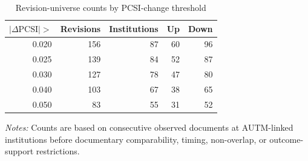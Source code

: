 \begin{table}[htbp]\centering
\caption{Revision-universe counts by PCSI-change threshold}\label{tab:thresholduniverse}
\begin{threeparttable}\small
\begin{tabular}{rrrrr}\toprule
$|\Delta\mathrm{PCSI}|>$ & Revisions & Institutions & Up & Down \\\midrule
0.020 & 156 & 87 & 60 & 96 \\
0.025 & 139 & 84 & 52 & 87 \\
0.030 & 127 & 78 & 47 & 80 \\
0.040 & 103 & 67 & 38 & 65 \\
0.050 & 83 & 55 & 31 & 52 \\
\bottomrule
\end{tabular}
\begin{tablenotes}[flushleft]\footnotesize
\item \textit{Notes:} Counts are based on consecutive observed documents at AUTM-linked institutions before documentary
comparability, timing, non-overlap, or outcome-support restrictions.
\end{tablenotes}
\end{threeparttable}
\end{table}

